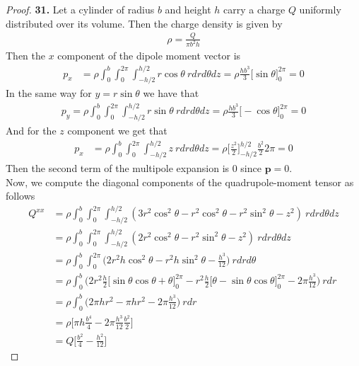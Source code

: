 \documentclass[11pt]{article}
\theoremstyle{definition}
\begin{document}
\cleardoublepage
\begin{proof}{\textbf{31.}}
Let a cylinder of radius $b$ and height $h$ carry a charge $Q$ uniformly
distributed over its volume. Then the charge density is given by
\begin{align*}
    \rho = \frac{Q}{\pi b^2 h}
\end{align*}
Then the $x$ component of the dipole moment vector is
\begin{align*}
    p_x &= \rho \int_0^b\int_0^{2\pi}\int_{-h/2}^{h/2} r\cos\theta~rdrd\theta dz
    = \rho \frac{hb^3}{3}\bigg[\sin\theta\bigg]_0^{2\pi}
    = 0
\end{align*}
In the same way for $y = r\sin\theta$ we have that
\begin{align*}
    p_y = \rho \int_0^b\int_0^{2\pi}\int_{-h/2}^{h/2} r\sin\theta~rdrd\theta dz
    = \rho \frac{hb^3}{3}\bigg[-\cos\theta\bigg]_0^{2\pi}
    = 0
\end{align*}
And for the $z$ component we get that
\begin{align*}
    p_x &= \rho \int_0^b\int_0^{2\pi}\int_{-h/2}^{h/2} z~rdrd\theta dz
    = \rho \bigg[\frac{z^2}{2}\bigg]_{-h/2}^{h/2}\frac{b^2}{2}2\pi
    = 0
\end{align*}
Then the second term of the multipole expansion is 0 since $\bm{p} = 0$.
\\
Now, we compute the diagonal components of the quadrupole-moment tensor as
follows
\begin{align*}
    Q^{xx} &= \rho \int_0^b\int_0^{2\pi}\int_{-h/2}^{h/2}
    (3r^2\cos^2\theta - r^2\cos^2\theta - r^2\sin^2\theta - z^2)~rdrd\theta dz\\
    &= \rho \int_0^b\int_0^{2\pi}\int_{-h/2}^{h/2}
    (2r^2\cos^2\theta - r^2\sin^2\theta - z^2)~rdrd\theta dz\\
    &= \rho \int_0^b\int_0^{2\pi}
    \bigg(2r^2h\cos^2\theta - r^2h\sin^2\theta - \frac{h^3}{12}\bigg)~rdrd\theta\\
    &= \rho \int_0^b
    \bigg(2r^2\frac{h}{2}\bigg[\sin\theta\cos\theta + \theta\bigg]_0^{2\pi}
    - r^2\frac{h}{2}\bigg[\theta - \sin\theta\cos\theta\bigg]_0^{2\pi}
    - 2\pi\frac{h^3}{12}\bigg)~rdr\\
    &= \rho \int_0^b
    \bigg(2\pi hr^2 - \pi hr^2- 2\pi\frac{h^3}{12}\bigg)~rdr\\
    &= \rho \bigg[\pi h\frac{b^4}{4} - 2\pi\frac{h^3}{12}\frac{b^2}{2}\bigg]\\
    &= Q\bigg[\frac{b^2}{4} - \frac{h^2}{12}\bigg]
\end{align*}

\end{proof}
\end{document}
